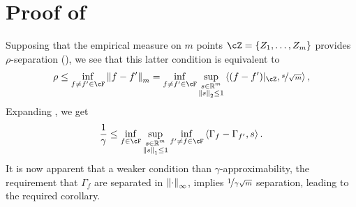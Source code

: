 

\section{Proof of }
\label{sec:approximability}

    Supposing that the empirical measure on $m$ points $\cZ = \left\{ Z_1, \dots, Z_m \right\}$ provides $\rho$-separation (), we see that this latter condition is equivalent to
\begin{align}\label{eq:rho_separation_dual}
    \rho \leq \inf_{f \neq f' \in \cF} \norm{f - f'}_m = \inf_{f \neq f' \in \cF} \sup_{\substack{s \in \rr^m \\ \norm{s}_2 \leq 1}} \inprod{(f - f')|_\cZ}{\nicefrac{s}{\sqrt{m}}},
\end{align}
    Expanding , we get
\begin{align}\label{eq:gamma_approx}
    \frac{1}{\gamma} \leq \inf_{f \in \cF} \sup_{\substack{s \in \rr^m \\ \norm{s}_1 \leq 1}} \inf_{f' \neq f \in \cF} \inprod{\Gamma_f - \Gamma_{f'}}{s}.
\end{align}
It is now apparent that a weaker condition than $\gamma$-approximability, the requirement that $\Gamma_f$ are separated in $\left\|\cdot\right\|_\infty$, implies $\nicefrac{1}{\gamma \sqrt{m}}$ separation, leading to the required corollary.
